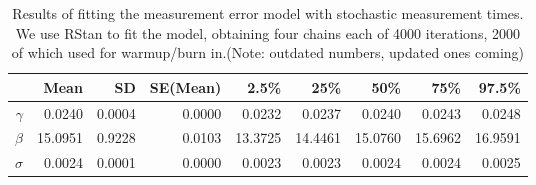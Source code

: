 \documentclass{article}
\begin{document}
\begin{table}[ht]
\centering
\begin{tabular}{rrrrrrrrr}
  \hline
 & Mean & SD & SE(Mean) & 2.5\% & 25\% & 50\% & 75\% & 97.5\% \\ 
  \hline
$\gamma$ & 0.0240 & 0.0004 & 0.0000 & 0.0232 & 0.0237 & 0.0240 & 0.0243 & 0.0248 \\ 
  $\beta$ & 15.0951 & 0.9228 & 0.0103 & 13.3725 & 14.4461 & 15.0760 & 15.6962 & 16.9591 \\ 
  $\sigma$ & 0.0024 & 0.0001 & 0.0000 & 0.0023 & 0.0023 & 0.0024 & 0.0024 & 0.0025 \\ 
   \hline
\end{tabular}
 \caption{Results of fitting the measurement error model with stochastic measurement times. We use RStan to fit the model, obtaining four chains each of 4000 iterations, 2000 of which used for warmup/burn in.\protect\footnotemark (Note: outdated numbers, updated ones coming) }
 \label{tab:modelfit}
\end{table}

\end{document}
